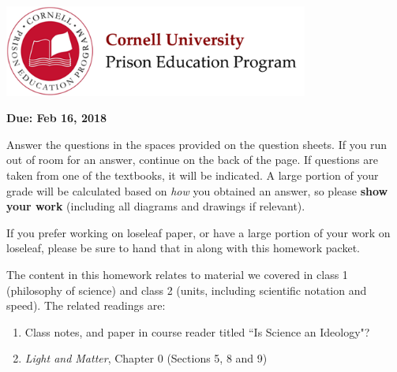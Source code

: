 \documentclass[addpoints,12pt]{exam}
\begin{document}

\begin{flushright}
\vspace{0.2in}

\end{flushright}

\begin{center}
\includegraphics[width=10cm]{../images/logo.png}
\end{center}

\begin{center}
\end{center}

\noindent\begin{large}\textbf{Due: Feb 16, 2018}\end{large}
\vspace{0.2in}

Answer the questions in the spaces provided on the question sheets. If you run out of room for an answer, continue on the back of the page. If questions are taken from one of the textbooks, it will be indicated. A large portion of your grade will be calculated based on \textit{how} you obtained an answer, so please \textbf{show your work} (including all diagrams and drawings if relevant).

If you prefer working on loseleaf paper, or have a large portion of your work on loseleaf, please be sure to hand that in along with this homework packet.

The content in this homework relates to material we covered in class 1 (philosophy of science) and class 2 (units, including scientific notation and speed). The related readings are:
\begin{enumerate}
\item Class notes, and paper in course reader titled ``Is Science an Ideology"?
\item \textit{Light and Matter}, Chapter 0 (Sections 5, 8 and 9)
\end{enumerate}
\end{document}
